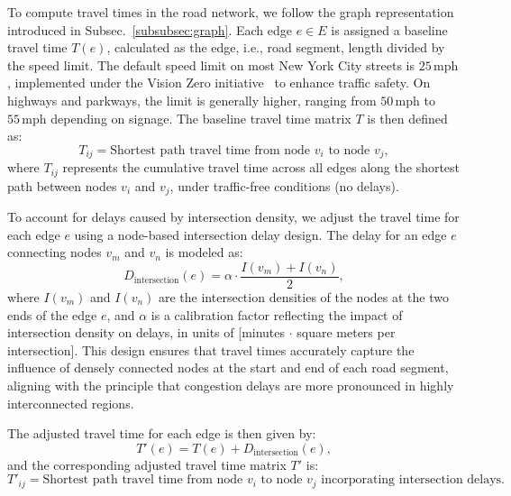 To compute travel times in the road network, we follow the graph representation introduced in Subsec.~\ref{subsubsec:graph}. Each edge \( e \in E \) is assigned a baseline travel time \( T(e) \), calculated as the edge, i.e., road segment, length divided by the speed limit. The default speed limit on most New York City streets is \( 25 \, \mathrm{mph} \), implemented under the Vision Zero initiative~\cite{nyc_speed_limit} to enhance traffic safety. On highways and parkways, the limit is generally higher, ranging from \( 50 \, \mathrm{mph} \) to \( 55 \, \mathrm{mph} \) depending on signage. The baseline travel time matrix \( T \) is then defined as:
\begin{equation}
    T_{ij} = \text{Shortest path travel time from node } v_i \text{ to node } v_j,
\end{equation}
where \( T_{ij} \) represents the cumulative travel time across all edges along the shortest path between nodes \( v_i \) and \( v_j \), under traffic-free conditions (no delays). 

To account for delays caused by intersection density, we adjust the travel time for each edge \( e \) using a node-based intersection delay design. The delay for an edge \( e \) connecting nodes \( v_m \) and \( v_n \) is modeled as:
\begin{equation}
    D_\text{intersection}(e) = \alpha \cdot \frac{I(v_m) + I(v_n)}{2},
\end{equation}
where \( I(v_m) \) and \( I(v_n) \) are the intersection densities of the nodes at the two ends of the edge \( e \), and \( \alpha \) is a calibration factor reflecting the impact of intersection density on delays, in units of [minutes $\cdot$ square meters per intersection]. This design ensures that travel times accurately capture the influence of densely connected nodes at the start and end of each road segment, aligning with the principle that congestion delays are more pronounced in highly interconnected regions.

The adjusted travel time for each edge is then given by:
\begin{equation}
    T'(e) = T(e) + D_\text{intersection}(e),
\end{equation}
and the corresponding adjusted travel time matrix \( T' \) is:
\begin{equation}
    T'_{ij} = \text{Shortest path travel time from node } v_i \text{ to node } v_j \text{ incorporating intersection delays.}
\end{equation}

